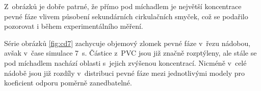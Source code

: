 \newpage
\noindent Z~obrázků je dobře patrné, že přímo pod míchadlem je největší koncentrace pevné fáze vlivem působení sekundárních cirkulačních smyček, což se podařilo pozorovat i během experimentálního měření.

Série obrázků \ref{fig:cd7} zachycuje objemový zlomek pevné fáze v~řezu nádobou, avšak v~čase simulace \SI{7}{\second}. Částice z~PVC jsou již značně rozptýleny, ale stále se pod míchadlem nachází oblasti s~jejich zvýšenou koncentrací. Nicméně v~celé nádobě jsou již rozdíly v~distribuci pevné fáze mezi jednotlivými modely pro koeficient odporu poměrně zanedbatelné.

\begin{figure}[h!]
 \centering
  \qquad             

\end{figure}
